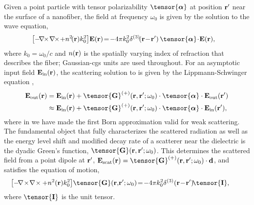 \documentclass[aps,pra,twocolumn]{revtex4-1} %
\newcommand{\inp}{{\rm in}}
\newcommand{\out}{{\rm out}}
\newcommand{\unittens}{\tensor{\mathbf{I}}}
\begin{document}
Given a point particle with tensor polarizability $\tensor{\boldsymbol{\alpha}}$ at position $\mathbf{r}'$ near the surface of a nanofiber, the field  at frequency $\omega_0$ is given by the solution to the wave equation, 
	\begin{align}\label{Eq::WaveEquationSource}
		\left[ - \!\nabla\!\!\times\!\nabla\!\!\times \!+  n^2\!(\br)k_0^2 \right]\! \mathbf{E}(\br) &\!=\! -4\pi  k_0^2 \delta^{(3)}\!(\br\!-\!\br')\,  \tensor{\boldsymbol{\alpha}}\!\cdot\! \mathbf{E}(\br),
	\end{align}
where $k_0=\omega_0/c$ and $n(\mathbf{r})$ is the spatially varying index of refraction that describes the fiber; Gaussian-cgs units are used throughout.  
For an asymptotic input field $\mathbf{E}_{\inp}(\br)$, the scattering solution to  is given by the Lippmann-Schwinger equation \cite{wubs_multiple-scattering_2004},
\begin{subequations}
	\begin{align}
		\mathbf{E}_{\out}(\br) &=\mathbf{E}_{\inp}(\br)+\tensor{\mathbf{G}}^{(+)}(\br , \br'; \omega_0)\cdot 
\tensor{\boldsymbol{\alpha}}\cdot \mathbf{E}_{\out}(\br')\\
		&\approx \mathbf{E}_{\inp}(\br)+ \tensor{\mathbf{G}}^{(+)}(\br , \br'; \omega_0) \cdot 
\tensor{\boldsymbol{\alpha}}\cdot \mathbf{E}_{\inp}(\br'), \label{Eq::ScatteredField}
	\end{align}
\end{subequations}
where in  we have made the first Born approximation valid for weak scattering. The fundamental object that fully characterizes the scattered radiation as well as the energy level shift and modified decay rate of a scatterer near the dielectric is the dyadic Green's function, $\tensor{\mathbf{G}}(\br, \br';\omega_0)$. This determines the scattered field from a point dipole at $\mathbf{r}'$, $\mathbf{E}_{\rm scat}(\br)= \tensor{\mathbf{G}}^{(+)}(\br , \br'; \omega_0)\cdot \mathbf{d}$, and satisfies the equation of motion,
	\begin{align} \label{Eq::GreensDiffEq}
		\!\!\!\!\!\!\left[ -\!\nabla\!\times\!\nabla\!\times + n^2(\mbf{r}) k_0^2 \right]\! \tensor{\mathbf{G}}(\br,\! \br';\omega_0) &\!=\! -4\pi 
k_0^2 \delta^{(3)}(\mathbf{r}\!-\!\mathbf{r}')\! \unittens,
	\end{align}
where $\unittens$ is the unit tensor.   
\end{document}
